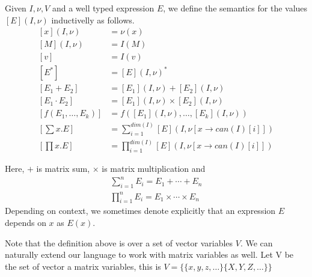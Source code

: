 Given $I, \nu, V$ and a well typed expression $E$, we define the semantics for the values $\left[ E\right](I,\nu)$ inductivelly as follows.
\begin{align*}
\left[ x\right](I,\nu)&=\nu (x)\\
\left[ M\right](I,\nu)&=I(M) \\
\left[ v\right]&=I(v) \\
\left[ E^*\right]&=\left[ E\right](I,\nu)^* \\
\left[ E_1+E_2\right]&= \left[ E_1\right](I,\nu)+\left[ E_2\right](I,\nu)\\
\left[ E_1\cdot E_2\right]&= \left[ E_1\right](I,\nu)\times \left[ E_2\right](I,\nu)\\
\left[ f(E_1,\ldots ,E_k)\right] &= f\left(\left[ E_1\right](I,\nu),\ldots , \left[  E_k\right](I,\nu)\right)\\
\left[ \sum x.E\right]&= \sum_{i=1}^{dim(I)}\left[ E\right](I, \nu [x\rightarrow can(I)[i]])\\
\left[ \prod x. E\right]&= \prod_{i=1}^{dim(I)}\left[ E\right](I, \nu [x\rightarrow can(I)[i]])
\end{align*}

Here, $+$ is matrix sum, $\times$ is matrix multiplication and 
\begin{align*}
\sum_{i=1}^n E_i = E_1+\cdots + E_n \\
\prod_{i=1}^n E_i = E_1\times \cdots\times E_n
\end{align*}
Depending on context, we sometimes denote explicitly that an expression $E$ depends on $x$ as $E(x)$.

Note that the definition above is over a set of vector variables $V$. We can naturally extend our language to work with matrix variables as well. Let V be the set of vector a matrix variables, this is $V=\lbrace\lbrace x, y, z, \ldots\rbrace\lbrace X,Y,Z,\ldots\rbrace\rbrace$

